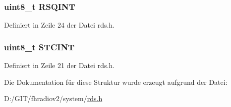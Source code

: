 \subsubsection[{R\+S\+Q\+I\+N\+T}]{\setlength{\rightskip}{0pt plus 5cm}uint8\+\_\+t R\+S\+Q\+I\+N\+T}\label{structstatus_a9637ec0bb6d40570ea68a1b96c5d561e}


Definiert in Zeile 24 der Datei rds.\+h.

\hypertarget{structstatus_a1026d3a63b328db2451abc49e0bd5a2c}{}
\subsubsection[{S\+T\+C\+I\+N\+T}]{\setlength{\rightskip}{0pt plus 5cm}uint8\+\_\+t S\+T\+C\+I\+N\+T}\label{structstatus_a1026d3a63b328db2451abc49e0bd5a2c}


Definiert in Zeile 21 der Datei rds.\+h.



Die Dokumentation für diese Struktur wurde erzeugt aufgrund der Datei\+:\begin{DoxyCompactItemize}
\item 
D\+:/\+G\+I\+T/fhradiov2/system/\hyperlink{rds_8h}{rds.\+h}\end{DoxyCompactItemize}
